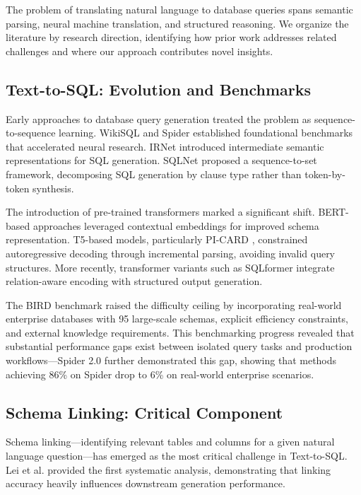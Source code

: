 \documentclass[conference]{IEEEtran}
\begin{document}
The problem of translating natural language to database queries spans semantic parsing, neural machine translation, and structured reasoning. We organize the literature by research direction, identifying how prior work addresses related challenges and where our approach contributes novel insights.

\subsection{Text-to-SQL: Evolution and Benchmarks}

Early approaches to database query generation treated the problem as sequence-to-sequence learning. WikiSQL \cite{b1} and Spider \cite{b2} established foundational benchmarks that accelerated neural research. IRNet \cite{c1} introduced intermediate semantic representations for SQL generation. SQLNet \cite{c2} proposed a sequence-to-set framework, decomposing SQL generation by clause type rather than token-by-token synthesis.

The introduction of pre-trained transformers marked a significant shift. BERT-based approaches \cite{c3, c4} leveraged contextual embeddings for improved schema representation. T5-based models, particularly PI-CARD \cite{c5}, constrained autoregressive decoding through incremental parsing, avoiding invalid query structures. More recently, transformer variants such as SQLformer \cite{c6} integrate relation-aware encoding with structured output generation.

The BIRD benchmark \cite{b3} raised the difficulty ceiling by incorporating real-world enterprise databases with 95 large-scale schemas, explicit efficiency constraints, and external knowledge requirements. This benchmarking progress revealed that substantial performance gaps exist between isolated query tasks and production workflows—Spider 2.0 \cite{c7} further demonstrated this gap, showing that methods achieving 86\% on Spider drop to 6\% on real-world enterprise scenarios.

\subsection{Schema Linking: Critical Component}

Schema linking—identifying relevant tables and columns for a given natural language question—has emerged as the most critical challenge in Text-to-SQL. Lei et al. \cite{c8} provided the first systematic analysis, demonstrating that linking accuracy heavily influences downstream generation performance.
\end{document}
